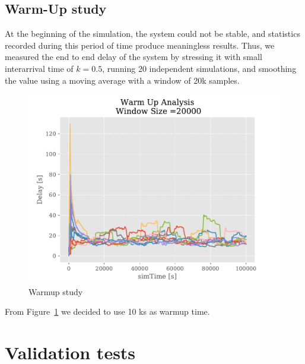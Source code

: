 \documentclass[a4paper,12pt]{article}
\begin{document}
\subsection{Warm-Up study}
At the beginning of the simulation, the system could not be stable, and statistics recorded during this period of time produce meaningless results.
Thus, we measured the end to end delay of the system by stressing it with small interarrival time of $k=0.5$, running 20 independent simulations, and smoothing the value using a moving average with a window of 20k samples.

\begin{figure}[H]
  \centering
  \includegraphics[width=.6\textwidth]{img/warmup-study.pdf}
  \caption{Warmup study}
  \label{fig:warmup-study}
\end{figure}

From Figure~\ref{fig:warmup-study} we decided to use 10 ks as warmup time.

\section{Validation tests}
\end{document}
